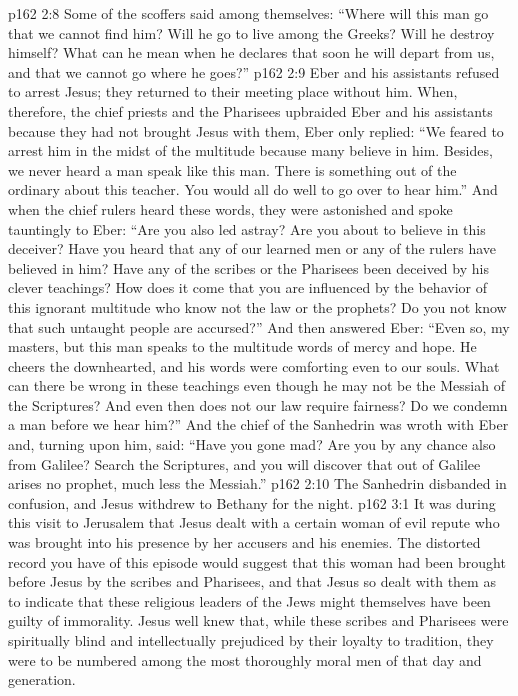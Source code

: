\vs p162 2:8 Some of the scoffers said among themselves: “Where will this man go that we cannot find him? Will he go to live among the Greeks? Will he destroy himself? What can he mean when he declares that soon he will depart from us, and that we cannot go where he goes?”
\vs p162 2:9 Eber and his assistants refused to arrest Jesus; they returned to their meeting place without him. When, therefore, the chief priests and the Pharisees upbraided Eber and his assistants because they had not brought Jesus with them, Eber only replied: “We feared to arrest him in the midst of the multitude because many believe in him. Besides, we never heard a man speak like this man. There is something out of the ordinary about this teacher. You would all do well to go over to hear him.” And when the chief rulers heard these words, they were astonished and spoke tauntingly to Eber: “Are you also led astray? Are you about to believe in this deceiver? Have you heard that any of our learned men or any of the rulers have believed in him? Have any of the scribes or the Pharisees been deceived by his clever teachings? How does it come that you are influenced by the behavior of this ignorant multitude who know not the law or the prophets? Do you not know that such untaught people are accursed?” And then answered Eber: “Even so, my masters, but this man speaks to the multitude words of mercy and hope. He cheers the downhearted, and his words were comforting even to our souls. What can there be wrong in these teachings even though he may not be the Messiah of the Scriptures? And even then does not our law require fairness? Do we condemn a man before we hear him?” And the chief of the Sanhedrin was wroth with Eber and, turning upon him, said: “Have you gone mad? Are you by any chance also from Galilee? Search the Scriptures, and you will discover that out of Galilee arises no prophet, much less the Messiah.”
\vs p162 2:10 The Sanhedrin disbanded in confusion, and Jesus withdrew to Bethany for the night.
\vs p162 3:1 It was during this visit to Jerusalem that Jesus dealt with a certain woman of evil repute who was brought into his presence by her accusers and his enemies. The distorted record you have of this episode would suggest that this woman had been brought before Jesus by the scribes and Pharisees, and that Jesus so dealt with them as to indicate that these religious leaders of the Jews might themselves have been guilty of immorality. Jesus well knew that, while these scribes and Pharisees were spiritually blind and intellectually prejudiced by their loyalty to tradition, they were to be numbered among the most thoroughly moral men of that day and generation.
